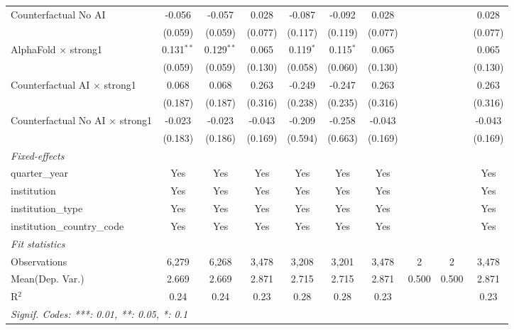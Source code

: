 \begin{tabular}{lccccccccc}
   Counterfactual No AI                   & -0.056       & -0.057       & 0.028   & -0.087      & -0.092      & 0.028   &     &     & 0.028\\   
                                          & (0.059)      & (0.059)      & (0.077) & (0.117)     & (0.119)     & (0.077) &     &     & (0.077)\\   
   AlphaFold $\times$ strong1             & 0.131$^{**}$ & 0.129$^{**}$ & 0.065   & 0.119$^{*}$ & 0.115$^{*}$ & 0.065   &     &     & 0.065\\   
                                          & (0.059)      & (0.059)      & (0.130) & (0.058)     & (0.060)     & (0.130) &     &     & (0.130)\\   
   Counterfactual AI $\times$ strong1     & 0.068        & 0.068        & 0.263   & -0.249      & -0.247      & 0.263   &     &     & 0.263\\   
                                          & (0.187)      & (0.187)      & (0.316) & (0.238)     & (0.235)     & (0.316) &     &     & (0.316)\\   
   Counterfactual No AI $\times$ strong1  & -0.023       & -0.023       & -0.043  & -0.209      & -0.258      & -0.043  &     &     & -0.043\\   
                                          & (0.183)      & (0.186)      & (0.169) & (0.594)     & (0.663)     & (0.169) &     &     & (0.169)\\   
   \midrule
   \emph{Fixed-effects}\\
   quarter\_year                          & Yes          & Yes          & Yes     & Yes         & Yes         & Yes     &     &     & Yes\\  
   institution                            & Yes          & Yes          & Yes     & Yes         & Yes         & Yes     &     &     & Yes\\  
   institution\_type                      & Yes          & Yes          & Yes     & Yes         & Yes         & Yes     &     &     & Yes\\  
   institution\_country\_code             & Yes          & Yes          & Yes     & Yes         & Yes         & Yes     &     &     & Yes\\  
   \midrule
   \emph{Fit statistics}\\
   Observations                           & 6,279        & 6,268        & 3,478   & 3,208       & 3,201       & 3,478   & 2   & 2   & 3,478\\  
Mean(Dep. Var.) & 2.669 & 2.669 & 2.871 & 2.715 & 2.715 & 2.871 & 0.500 & 0.500 & 2.871 \\
   R$^2$                                  & 0.24         & 0.24         & 0.23    & 0.28        & 0.28        & 0.23    &     &     & 0.23\\  
   \midrule \midrule
   \multicolumn{10}{l}{\emph{Signif. Codes: ***: 0.01, **: 0.05, *: 0.1}}\\
\end{tabular}
\par\endgroup
